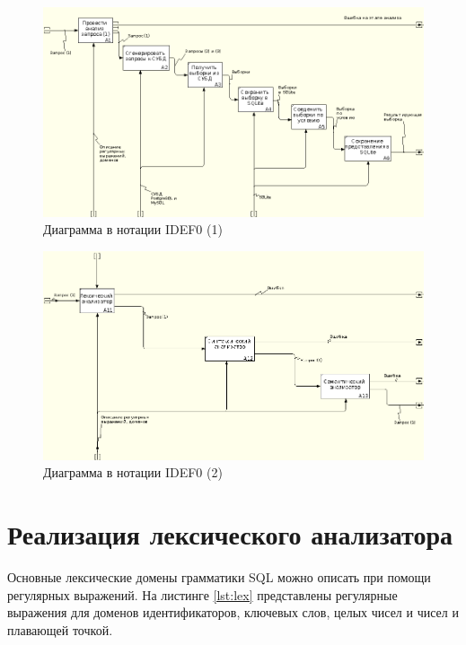 \begin{figure}[h!]
	\begin{center}
		\includegraphics[scale=0.68]{./inc/img/idef0_1}
		\caption{Диаграмма в нотации IDEF0 (1)}
		\label{img:idef0_1}
	\end{center}
\end{figure}

\begin{figure}[h!]
	\begin{center}
		\includegraphics[scale=0.68]{./inc/img/idef0_2}
		\caption{Диаграмма в нотации IDEF0 (2)}
		\label{img:idef0_2}
	\end{center}
\end{figure}


\section{Реализация лексического анализатора}

Основные лексические домены грамматики SQL можно описать при помощи регулярных выражений. На листинге \ref{lst:lex} представлены регулярные выражения для доменов идентификаторов, ключевых слов, целых чисел и чисел и плавающей точкой.

